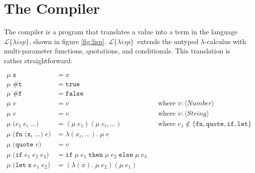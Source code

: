 \documentclass[a4paper]{article}
\newcommand{\lisp}{\ensuremath{\mathcal{L}\{\lambda isp\}}}
\begin{document}
\section{The Compiler}

The compiler is a program that translates a value into a term in the language \lisp, shown in figure \ref{fig:lisp}. \lisp\ extends the untyped $\lambda$-calculus with multi-parameter functions, quotations, and conditionals. This translation is rather straightforward:

$$
\begin{aligned}
\mu\;\mathtt{x} &= x \\
\mu\;\texttt{\#t} &= \mathtt{true} \\
\mu\;\texttt{\#f} &= \mathtt{false} \\
\mu\;v &= v && \text{where $v : \langle Number \rangle$} \\
\mu\;v &= v && \text{where $v : \langle String \rangle$} \\
\mu\;\texttt{(} e_1\;e_i\;\dots \texttt{)} &= (\mu\;e_1)(\mu\;e_i, \dots) && \text{where $e_1 \not\in \{\mathtt{fn}, \mathtt{quote}, \mathtt{if}, \mathtt{let}\}$} \\
\mu\;\texttt{(} \mathtt{fn}\;\texttt{(}\mathtt{x}_i\; \dots\texttt{)}\;e \texttt{)} &= \lambda(x_i, \dots).\;\mu\;e \\
\mu\;\texttt{(} \mathtt{quote}\;v \texttt{)} &= v \\
\mu\;\texttt{(} \mathtt{if}\;e_1\;e_2\;e_3 \texttt{)} &= \mathtt{if}\;\mu\;e_1\;\mathtt{then}\;\mu\;e_2\;\mathtt{else}\;\mu\;e_3 \\
\mu\;\texttt{(} \mathtt{let}\;\mathtt{x}\;e_1\;e_2 \texttt{)} &= (\lambda(x).\;\mu\;e_2)(\mu\;e_1) \\
\end{aligned}
$$
\end{document}
